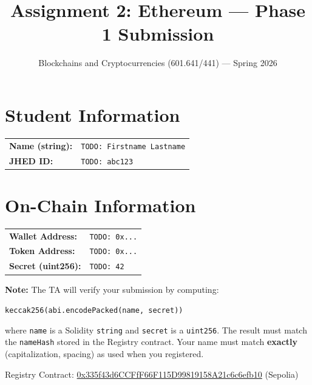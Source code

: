 \documentclass[11pt]{article}
\title{Assignment 2: Ethereum --- Phase 1 Submission}
\author{Blockchains and Cryptocurrencies (601.641/441) --- Spring 2026}
\date{}
\begin{document}
\maketitle

\section*{Student Information}

\begin{tabular}{l l}
\textbf{Name (string):} & \texttt{TODO: Firstname Lastname} \\[6pt]
\textbf{JHED ID:}        & \texttt{TODO: abc123} \\
\end{tabular}

\section*{On-Chain Information}

\begin{tabular}{l p{10cm}}
\textbf{Wallet Address:} & \texttt{TODO: 0x...} \\[6pt]
\textbf{Token Address:}  & \texttt{TODO: 0x...} \\[6pt]
\textbf{Secret (uint256):} & \texttt{TODO: 42} \\
\end{tabular}

\vspace{1em}

\noindent\textbf{Note:} The TA will verify your submission by computing:

\begin{center}
\texttt{keccak256(abi.encodePacked(name, secret))}
\end{center}

\noindent where \texttt{name} is a Solidity \texttt{string} and \texttt{secret} is a \texttt{uint256}. The result must match the \texttt{nameHash} stored in the Registry contract. Your name must match \textbf{exactly} (capitalization, spacing) as used when you registered.

\vspace{1em}

\noindent Registry Contract: \href{https://sepolia.etherscan.io/address/0x335f43d6CCFfF66F115D99819158A21c6c6efb10}{0x335f43d6CCFfF66F115D99819158A21c6c6efb10} (Sepolia)
\end{document}
